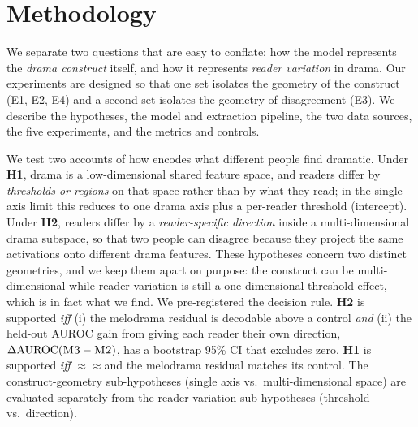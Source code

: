 \section{Methodology}\label{sec:method}

We separate two questions that are easy to conflate: how the model represents the \emph{drama construct} itself, and how it represents \emph{reader variation} in drama. Our experiments are designed so that one set isolates the geometry of the construct (E1, E2, E4) and a second set isolates the geometry of disagreement (E3). We describe the hypotheses, the model and extraction pipeline, the two data sources, the five experiments, and the metrics and controls.

 We test two accounts of how \qwenbig encodes what different people find dramatic. Under \textbf{H1}, drama is a low-dimensional shared feature space, and readers differ by \emph{thresholds or regions} on that space rather than by what they read; in the single-axis limit this reduces to one drama axis plus a per-reader threshold (intercept). Under \textbf{H2}, readers differ by a \emph{reader-specific direction} inside a multi-dimensional drama subspace, so that two people can disagree because they project the same activations onto different drama features. These hypotheses concern two distinct geometries, and we keep them apart on purpose: the construct can be multi-dimensional while reader variation is still a one-dimensional threshold effect, which is in fact what we find. We pre-registered the decision rule. \textbf{H2} is supported \emph{iff} (i) the melodrama residual is decodable above a control \emph{and} (ii) the held-out AUROC gain from giving each reader their own direction, $\Delta\mathrm{AUROC}(\textsc{M3}-\textsc{M2})$, has a bootstrap 95\% CI that excludes zero. \textbf{H1} is supported \emph{iff} \Mone${\approx}$\Mtwo${\approx}$\Mthree and the melodrama residual matches its control. The construct-geometry sub-hypotheses (single axis vs.\ multi-dimensional space) are evaluated separately from the reader-variation sub-hypotheses (threshold vs.\ direction).

